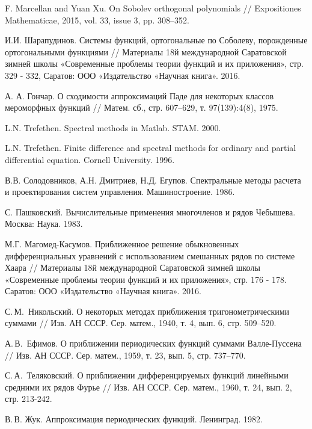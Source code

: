  F. Marcellan and Yuan Xu. On Sobolev orthogonal polynomials //  Expositiones Mathematicae, 2015, vol. 33, issue 3, pp. 308–352.

 И.И. Шарапудинов. Системы функций, ортогональные по Соболеву, порожденные ортогональными функциями // Материалы 18й международной Саратовской зимней школы «Современные проблемы теории функций и их приложения», стр. 329 - 332, Саратов: ООО «Издательство «Научная книга». 2016.

 А. А. Гончар. О сходимости аппроксимаций Паде для некоторых классов мероморфных функций // Матем. сб., стр. 607–629, т. 97(139):4(8), 1975.

   L.N. Trefethen. Spectral methods in Matlab. STAM. 2000.

   L.N. Trefethen. Finite difference and spectral methods for ordinary and partial differential equation. Cornell University. 1996.

  В.В. Солодовников, А.Н. Дмитриев, Н.Д. Егупов. Спектральные методы расчета и проектирования систем управления. Машиностроение. 1986.

 С. Пашковский. Вычислительные применения многочленов и рядов Чебышева. Москва: Наука. 1983.

 М.Г. Магомед-Касумов. Приближенное решение обыкновенных дифференциальных уравнений с использованием смешанных рядов по системе Хаара // Материалы 18й международной Саратовской зимней школы «Современные проблемы теории функций и их приложения», стр. 176 - 178. Саратов: ООО «Издательство «Научная книга». 2016.

 С.\,М.~Никольский. О некоторых методах приближения тригонометрическими суммами // Изв. АН СССР. Сер. матем., 1940, т. 4, вып.  6, стр. 509–520.


 А.\,В.~Ефимов. О приближении периодических функций суммами Валле-Пуссена // Изв. АН СССР. Сер. матем., 1959,  т. 23, вып. 5, стр. 737–770.

 С.\,А.~Теляковский. О приближении дифференцируемых функций линейными средними их рядов Фурье // Изв. АН СССР. Сер. матем., 1960, т. 24, вып. 2, стр. 213-242.





 В.\,В. Жук. Аппроксимация периодических функций. Ленинград. 1982.


